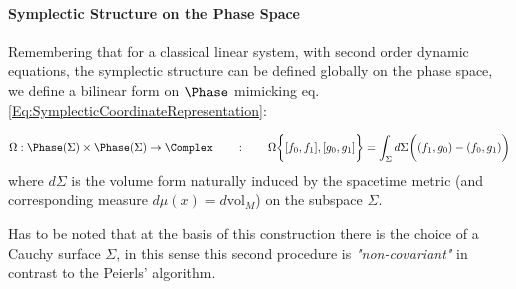 \documentclass[Main]{subfiles}
\begin{document}
		\paragraph{Symplectic Structure on the Phase Space}
			Remembering that for a classical linear system, with second order dynamic equations, the symplectic structure can be defined globally on the phase space, we define a bilinear form on $\Phase$ mimicking eq. \ref{Eq:SymplecticCoordinateRepresentation}:
			\begin{definition}
				\begin{displaymath}
					\Omega: \Phase(\Sigma) \times \Phase(\Sigma) \rightarrow \Complex \qquad : \qquad 					
					\Omega \biggr\{ [f_0,f_1] , [g_0, g_1] \biggr\} = \int_\Sigma d\Sigma \biggr( (f_1,g_0)  - ( f_0, g_1) \biggr)
				\end{displaymath}
				where $d\Sigma$ is the volume form naturally induced by the spacetime metric (and corresponding measure $d\mu(x)= d\textrm{vol}_M$) on the subspace $\Sigma$.
			\end{definition}			
			
			Has to be noted that at the basis of this construction there is the choice of a Cauchy surface $\Sigma$, in this sense this second procedure is \emph{"non-covariant"} in contrast to the Peierls' algorithm.
				
\end{document}
